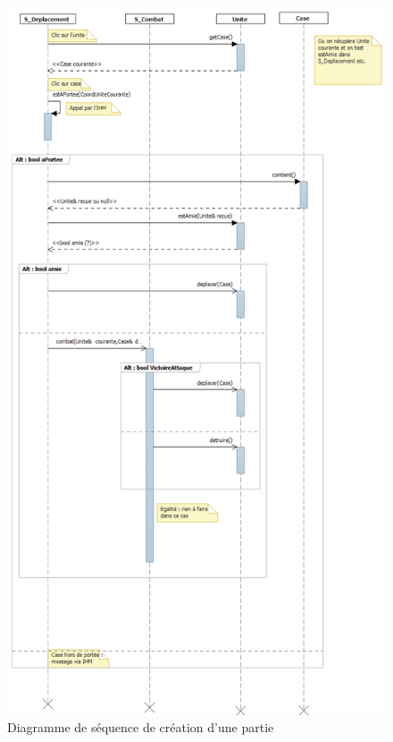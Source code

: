 \documentclass[a4paper]{article}%
\begin{document}
\begin{figure}[H]
   \centering
   \includegraphics[width=\textwidth]{./images/sequence/DiagSeqCreationPartie.png}
                \caption{Diagramme de séquence de création d'une partie}
                \label{fig:sequence_creationpartie}
\end{figure}

\newpage
\end{document}
